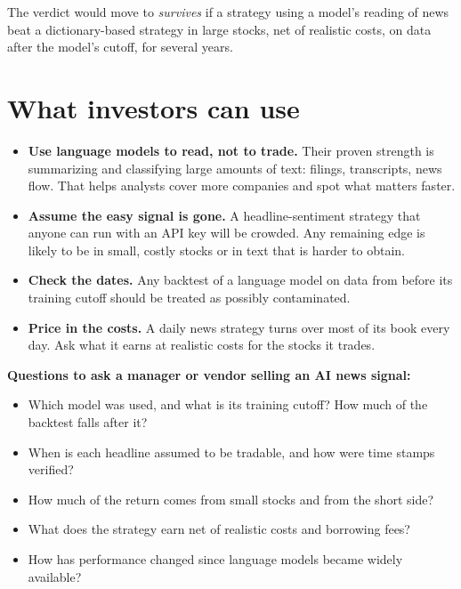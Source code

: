 The verdict would move to \emph{survives} if a strategy using a model's reading of news beat a dictionary-based strategy in large stocks, net of realistic costs, on data after the model's cutoff, for several years.

\section{What investors can use}
\label{sec:23-investors}

\begin{itemize}
  \item \textbf{Use language models to read, not to trade.} Their proven strength is summarizing and classifying large amounts of text: filings, transcripts, news flow. That helps analysts cover more companies and spot what matters faster.
  \item \textbf{Assume the easy signal is gone.} A headline-sentiment strategy that anyone can run with an API key will be crowded. Any remaining edge is likely to be in small, costly stocks or in text that is harder to obtain.
  \item \textbf{Check the dates.} Any backtest of a language model on data from before its training cutoff should be treated as possibly contaminated.
  \item \textbf{Price in the costs.} A daily news strategy turns over most of its book every day. Ask what it earns at realistic costs for the stocks it trades.
\end{itemize}

\textbf{Questions to ask a manager or vendor selling an AI news signal:}

\begin{itemize}
  \item Which model was used, and what is its training cutoff? How much of the backtest falls after it?
  \item When is each headline assumed to be tradable, and how were time stamps verified?
  \item How much of the return comes from small stocks and from the short side?
  \item What does the strategy earn net of realistic costs and borrowing fees?
  \item How has performance changed since language models became widely available?
\end{itemize}


